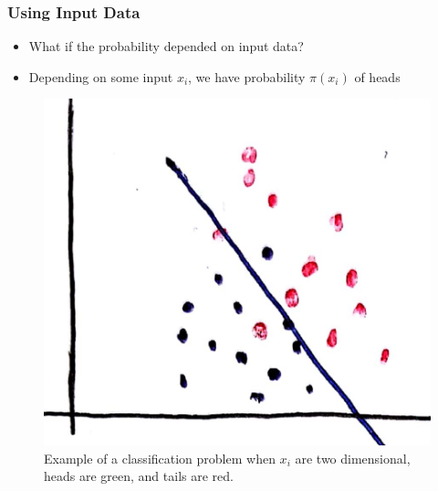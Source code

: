\documentclass[10pt,mathserif]{beamer}
\begin{document}
\begin{frame}
  \frametitle{Using Input Data}
  \begin{itemize}
  \item What if the probability depended on input data?
  \item Depending on some input $x_i$, we have probability $\pi\left(x_i\right)$
    of heads
  \end{itemize}
  \begin{figure}
    \centering
    \includegraphics[width=0.3\paperwidth]{figure/logistic_scatter_plane}
    \caption{Example of a classification problem when $x_i$ are two dimensional,
      heads are green, and tails are red. \label{fig:logistic_scatter} }
  \end{figure}
\end{frame}
\end{document}
